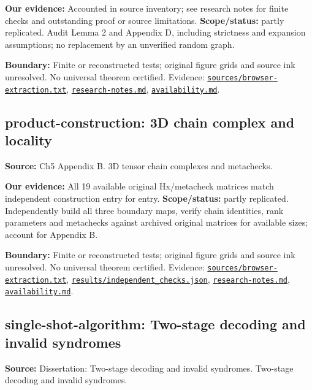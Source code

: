\documentclass[11pt]{article}
\begin{document}
\textbf{Our evidence:} Accounted in source inventory; see research notes for finite checks and outstanding proof or source limitations. \textbf{Scope/status:} partly replicated. Audit Lemma 2 and Appendix D, including strictness and expansion assumptions; no replacement by an unverified random graph.

\textbf{Boundary:} Finite or reconstructed tests; original figure grids and source ink unresolved. No universal theorem certified. Evidence: \href{https://github.com/alectionary/vibe-math/blob/master/formalization/quintavalle-hgp/sources/browser-extraction.txt}{\nolinkurl{sources/browser-extraction.txt}}, \href{https://github.com/alectionary/vibe-math/blob/master/formalization/quintavalle-hgp/research-notes.md}{\nolinkurl{research-notes.md}}, \href{https://github.com/alectionary/vibe-math/blob/master/formalization/quintavalle-hgp/availability.md}{\nolinkurl{availability.md}}.
\subsection{product-construction: 3D chain complex and locality}
\label{claim:product-construction}
\textbf{Source:} Ch5 Appendix B. 3D tensor chain complexes and metachecks.

\textbf{Our evidence:} All 19 available original Hx/metacheck matrices match independent construction entry for entry. \textbf{Scope/status:} partly replicated. Independently build all three boundary maps, verify chain identities, rank parameters and metachecks against archived original matrices for available sizes; account for Appendix B.

\textbf{Boundary:} Finite or reconstructed tests; original figure grids and source ink unresolved. No universal theorem certified. Evidence: \href{https://github.com/alectionary/vibe-math/blob/master/formalization/quintavalle-hgp/sources/browser-extraction.txt}{\nolinkurl{sources/browser-extraction.txt}}, \href{https://github.com/alectionary/vibe-math/blob/master/formalization/quintavalle-hgp/results/independent_checks.json}{\nolinkurl{results/independent_checks.json}}, \href{https://github.com/alectionary/vibe-math/blob/master/formalization/quintavalle-hgp/research-notes.md}{\nolinkurl{research-notes.md}}, \href{https://github.com/alectionary/vibe-math/blob/master/formalization/quintavalle-hgp/availability.md}{\nolinkurl{availability.md}}.
\subsection{single-shot-algorithm: Two-stage decoding and invalid syndromes}
\label{claim:single-shot-algorithm}
\textbf{Source:} Dissertation: Two-stage decoding and invalid syndromes. Two-stage decoding and invalid syndromes.
\end{document}
